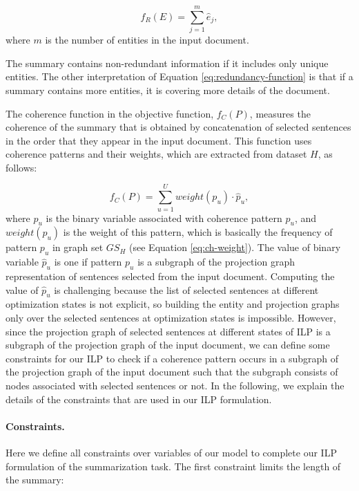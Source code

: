 \begin{equation}
\label{eq:redundancy-function}
f_R(E) = \sum_{j=1}^{m}{\hat{e}_j},
\end{equation}
where $m$ is the number of entities in the input document. 

The summary contains non-redundant information if it includes only unique entities. 
The other interpretation of Equation \ref{eq:redundancy-function} is that if a summary contains more entities, it is covering more details of the document. 

The coherence function in the objective function, $f_C(P)$, measures the coherence of the summary that is obtained by concatenation of selected sentences in the order that they appear in the input document. 
This function uses coherence patterns and their weights, which are extracted from dataset $H$, as follows:

\begin{equation}
f_C(P) = \sum_{u=1}^{U}{weight(p_u) \cdot \hat{p}_u},
\end{equation}
where $\hat{p}_u$ is the binary variable associated with coherence pattern $p_u$, and $weight(p_u)$ is the weight of this pattern, which is basically the frequency of pattern $p_u$ in graph set $GS_H$ (see Equation \ref{eq:ch-weight}). 
The value of binary variable $\hat{p}_u$ is one if pattern $p_u$ is a subgraph of the projection graph representation of sentences selected from the input document. 
Computing the value of $\hat{p}_u$ is challenging because the list of selected sentences at different optimization states is not explicit, so building the entity and projection graphs only over the selected sentences at optimization states is impossible. 
However, since the projection graph of selected sentences at different states of ILP is a subgraph of the projection graph of the input document, we can define some constraints for our ILP to check if a coherence pattern occurs in a subgraph of the projection graph of the input document such that the subgraph consists of nodes associated with selected sentences or not. 
In the following, we explain the details of the constraints that are used in our ILP formulation.  

\paragraph{Constraints.}
Here we define all constraints over variables of our model to complete our ILP formulation of the summarization task. 
The first constraint limits the length of the summary:

